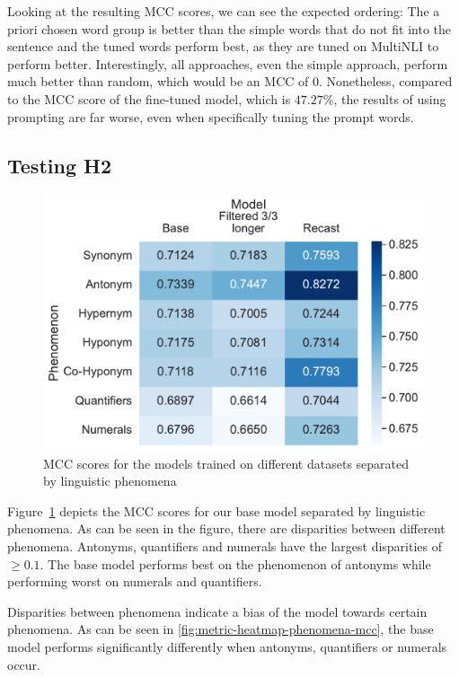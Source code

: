 Looking at the resulting \ac{MCC} scores, we can see the expected ordering: The a priori chosen word group is better than the simple words that do not fit into the sentence and the tuned words perform best, as they are tuned on \ac{MultiNLI} to perform better. Interestingly, all approaches, even the simple approach, perform much better than random, which would be an \ac{MCC} of $0$. Nonetheless, compared to the \ac{MCC} score of the fine-tuned model, which is $47.27\%$, the results of using prompting are far worse, even when specifically tuning the prompt words.

\subsection{Testing H2}
\begin{figure}[ht]
    \centering
    \includegraphics[width=0.9\columnwidth]{./images/metric_heatmaps_phenomena/all_words/base_filtered_recast_matthews_correlation.pdf}
    \caption{\ac{MCC} scores for the models trained on different datasets separated by linguistic phenomena}
    \label{fig:metric-heatmap-phenomena-mcc}
\end{figure}

Figure~\ref{fig:metric-heatmap-phenomena-mcc} depicts the \acs{MCC} scores for our base model separated by linguistic phenomena. As can be seen in the figure, there are disparities between different phenomena. Antonyms, quantifiers and numerals have the largest disparities of $\geq 0.1$. The base model performs best on the phenomenon of antonyms while performing worst on numerals and quantifiers.

Disparities between phenomena indicate a bias of the model towards certain phenomena. As can be seen in \autoref{fig:metric-heatmap-phenomena-mcc}, the base model performs significantly differently when antonyms, quantifiers or numerals occur.

